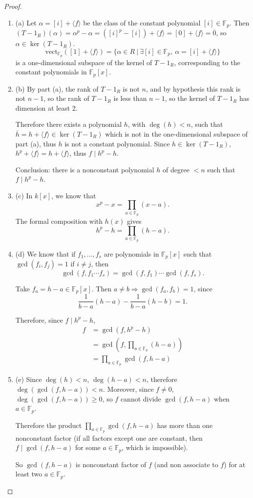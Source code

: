 \documentclass[11pt,a4paper]{article}
\newcommand{\be} {\begin{enumerate}}
\newcommand{\ee} {\end{enumerate}}
\newcommand{\F}{\mathbb{F}}
\begin{document}
\begin{proof}
\be
\item[(a)] Let $\alpha = [i] + \langle f \rangle$ be the class of the constant polynomial $[i] \in \F_p$. Then $(T -1_R)(\alpha) = \alpha^p - \alpha = ([i]^p - [i]) + \langle f \rangle = [0] + \langle f \rangle = \overline{0}$, so $\alpha \in \ker(T-1_R)$. 
$$\mathrm{vect}_{\F_p} ([1]+ \langle f \rangle) = \{\alpha \in R\ | \ \exists [i] \in \F_p, \ \alpha = [i] + \langle f \rangle\}$$
is a one-dimensional subspace of the kernel of $T-1_R$, corresponding to the constant polynomials in $\F_p[x]$.

\item[(b)] By part (a), the rank of $T-1_R$ is not $n$, and by hypothesis this rank is not $n-1$, so the rank of $T-1_R$ is less than $n-1$, so the kernel of $T-1_R$ has dimension at least 2.

Therefore there exists a polynomial $h$, with $\deg(h)<n$, such that $\overline{h} = h + \langle f \rangle \in \ker(T-1_R)$ which is not in the one-dimensional subspace of part (a), thus $h$ is not a constant polynomial. Since $h \in \ker(T-1_R)$, $h^p + \langle f \rangle = h + \langle f \rangle$, thus $f \mid h^p-h$.

Conclusion: there is a nonconstant polynomial $h$ of degree $<n$ such that $f \mid h^p - h$.

\item[(c)] In $k[x]$, we know that
$$x^p -x = \prod_{a \in \F_p} (x- a).$$
The formal composition with $h(x)$ gives
$$h^p -h = \prod_{a \in \F_p} (h- a).$$

\item[(d)] We know that if $f_1,\ldots,f_s$ are  polynomials in $\F_p[x]$ such that $\gcd(f_i,f_j)=1$ if $i\ne j$, then
$$\gcd(f,f_1\cdots f_s) = \gcd(f,f_1) \cdots \gcd(f,f_s).$$

Take $f_a = h-a \in \F_p[x]$. Then  $a \ne b \Rightarrow \gcd(f_a,f_b) = 1$, since $$\frac{1}{b-a} (h-a) - \frac{1}{b-a}(h-b) = 1.$$

Therefore, since $f \mid h^p-h$,
\begin{align*}
f &= \gcd(f,h^p-h)\\
&= \gcd(f,  \prod_{a \in \F_p} (h- a))\\
&=  \prod_{a \in \F_p} \gcd(f,h-a)
\end{align*}

\item[(e)] Since $\deg(h)<n$, $\deg(h-a)<n$, therefore $\deg(\gcd(f,h-a))<n$. Moreover, since $f \ne 0$, $\deg(\gcd(f,h-a))\geq  0$, so $f$ cannot divide $\gcd(f,h-a)$ when $a \in \F_p$. 

Therefore the product $\prod_{a \in \F_p} \gcd(f,h-a)$ has more than one nonconstant factor (if all factors except one are constant, then $f \mid \gcd(f,h-a)$ for some $a \in \F_p$, which is impossible). 

So $\gcd(f,h-a)$ is nonconstant factor of $f$ (and non associate to $f$) for at least two $a\in \F_p$.
\ee
\end{proof}
\end{document}
